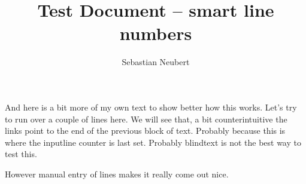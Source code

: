 \documentclass[12pt]{article}
\begin{document}

\title{Test Document -- smart line numbers}
\author{Sebastian Neubert}
\date{}
\maketitle
\thispagestyle{empty}
\pagestyle{empty}

\blindtext

And here is a bit more of my own text to show better how this works. Let's try to run over a couple of lines here. We will see that, a bit counterintuitive the links point to the end of the previous block of text. Probably because this is where the inputline counter is last set.
Probably blindtext is not the best way to test this.

However manual entry of lines makes it really come out nice.
\end{document}

